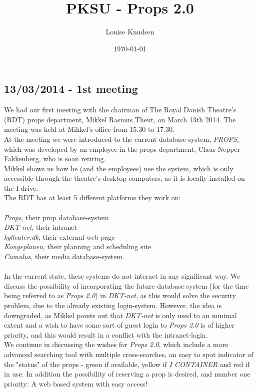 \documentclass[12pt]{article}
\title{PKSU - Props 2.0}
\author{Louise Knudsen}
\date{\today}
\begin{document}
\maketitle
\subsection*{13/03/2014 - 1st meeting}
We had our first meeting with the chairman of The Royal Danish Theatre's (RDT) props department, Mikkel Rasmus Theut, on March 13th 2014. The meeting was held at Mikkel's office from 15.30 to 17.30. \\
At the meeting we were introduced to the current database-system, \textit{PROPS}, which was developed by an employee in the props department, Claus Nepper Fakkenberg, who is soon retiring.\\
Mikkel shows us how he (and the employees) use the system, which is only accessible through the theatre's desktop computers, as it is locally installed on the I-drive. \\
The RDT has at least 5 different platforms they work on: \\\\
\textit{Props}, their prop database-system \\
\textit{DKT-net}, their intranet \\
\textit{kglteater.dk}, their external web-page  \\
\textit{Kongeplanen}, their planning and scheduling site \\
\textit{Cumulus}, their media database-system. \\\\
In the current state, these systems do not interact in any significant way. We discuss the possibility of incorporating the future database-system (for the time being referred to as \textit{Props 2.0}) in \textit{DKT-net}, as this would solve the security problem, due to the already existing login-system. However, the idea is downgraded, as Mikkel points out that \textit{DKT-net} is only used to an minimal extent and a wish to have some sort of guest login to \textit{Props 2.0} is of higher priority, and this would result in a conflict with the intranet-login. \\
We continue in discussing the wishes for \textit{Props 2.0}, which include a more advanced searching tool with multiple cross-searches, an easy to spot indicator of the "status" of the props - green if available, yellow if \textit{I CONTAINER} and red if in use. In addition the possibility of reserving a prop is desired, and number one priority: A web based system with easy access! \\
\end{document}
